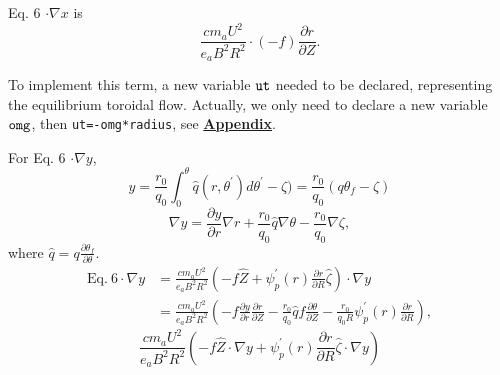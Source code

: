 \documentclass[12pt]{article}
\begin{document}
\begin{CJK*}{UTF8}{gbsn}
Eq. 6 $\cdot \nabla x$ is
\begin{equation}
    \frac{cm_aU^2}{e_aB^2R^2} \cdot (-f) \frac{\partial r}{\partial Z}.
\end{equation}

To implement this term, a new variable ${\tt ut}$ needed to be declared, representing the equilibrium toroidal flow. 
Actually, we only need to declare a new variable ${\tt omg}$, then \texttt{ut=-omg*radius}, see \hyperref[app]{\bf Appendix}.

For Eq. 6 $\cdot \nabla y$, 
\begin{equation}
    y = \frac{r_0}{q_0}\int_{0}^{\theta}\hat{q}(r,\theta^{'})d\theta^{'}-\zeta)=\frac{r_0}{q_0}(q\theta_f-\zeta)
\end{equation}
\begin{equation}
    \nabla y = \frac{\partial y}{\partial r} \nabla r + \frac{r_0}{q_0} \hat{q} \nabla \theta - \frac{r_0}{q_0} \nabla \zeta,\label{eqdely}
\end{equation}
where $\hat{q} = q \frac{\partial \theta_f}{\partial \theta}$. 
\begin{equation}
\begin{split}
    \textrm{Eq.}\ 6 \cdot \nabla y &= \frac{cm_aU^2}{e_aB^2R^2}(-f\hat{Z} + \psi_p^{'}(r)\frac{\partial r}{\partial R} \hat{\zeta}) \cdot \nabla y \\
                                   &= \frac{cm_aU^2}{e_aB^2R^2}(-f \frac{\partial y}{\partial r} \frac{\partial r}{\partial Z} - \frac{r_0}{q_0} \hat{q} f 
                                      \frac{\partial \theta}{\partial Z} - \frac{r_0}{q_0R} \psi_p^{'}(r)\frac{\partial r}{\partial R}), 
\end{split}
\end{equation}
{\color{blue}
\begin{equation*}
    \frac{cm_aU^2}{e_aB^2R^2}(-f\hat{Z}\cdot\nabla y + \psi_p^{'}(r)\frac{\partial r}{\partial R} \hat{\zeta}\cdot\nabla y)  
\end{equation*}
}


\end{CJK*}
\end{document}
